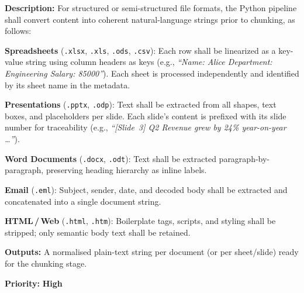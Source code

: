 \documentclass[12pt, a4paper]{article}
\begin{document}
\begin{tcolorbox}[enhanced, colback=white, colframe=ctPurple,
    colbacktitle=ctLightPurple, coltitle=ctPurple, boxrule=0.5pt,
    leftrule=4pt, arc=2mm, fonttitle=\large\bfseries,
    title={FR-1b: Structured Data Linearization},
    drop fuzzy shadow=black!5!white, top=2pt, bottom=2pt]
\begin{prolist}
    \item \textbf{Description:} For structured or semi-structured file
    formats, the Python pipeline shall convert content into coherent
    natural-language strings prior to chunking, as follows:
    \begin{prolist}
        \item \textbf{Spreadsheets} (\texttt{.xlsx}, \texttt{.xls},
        \texttt{.ods}, \texttt{.csv}): Each row shall be linearized as a
        key-value string using column headers as keys
        (e.g., \textit{``Name: Alice \textbar{} Department: Engineering
        \textbar{} Salary: 85000''}). Each sheet is processed independently
        and identified by its sheet name in the metadata.

        \item \textbf{Presentations} (\texttt{.pptx}, \texttt{.odp}): Text
        shall be extracted from all shapes, text boxes, and placeholders per
        slide. Each slide's content is prefixed with its slide number for
        traceability
        (e.g., \textit{``[Slide~3] Q2 Revenue grew by 24\% year-on-year%
        \ldots''}).

        \item \textbf{Word Documents} (\texttt{.docx}, \texttt{.odt}): Text
        shall be extracted paragraph-by-paragraph, preserving heading
        hierarchy as inline labels.

        \item \textbf{Email} (\texttt{.eml}): Subject, sender, date, and
        decoded body shall be extracted and concatenated into a single
        document string.

        \item \textbf{HTML\,/\,Web} (\texttt{.html}, \texttt{.htm}):
        Boilerplate tags, scripts, and styling shall be stripped; only
        semantic body text shall be retained.
    \end{prolist}

    \item \textbf{Outputs:} A normalised plain-text string per document (or
    per sheet/slide) ready for the chunking stage.

    \item \textbf{Priority:} \textcolor{alertRed}{\textbf{High}}
\end{prolist}
\end{tcolorbox}
\end{document}
